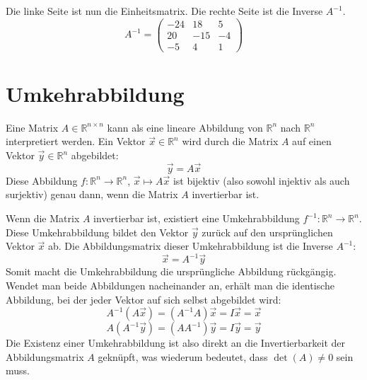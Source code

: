 Die linke Seite ist nun die Einheitsmatrix. Die rechte Seite ist die Inverse
\(A^{-1}\).
\[ A^{-1} = \begin{pmatrix}
        -24 & 18  & 5  \\
        20  & -15 & -4 \\
        -5  & 4   & 1
    \end{pmatrix} \]

\section{Umkehrabbildung}

Eine Matrix \(A \in \mathbb{R}^{n \times n}\) kann als eine lineare Abbildung
von \(\mathbb{R}^n\) nach \(\mathbb{R}^n\) interpretiert werden. Ein Vektor
\(\vec{x} \in \mathbb{R}^n\) wird durch die Matrix \(A\) auf einen Vektor
\(\vec{y} \in \mathbb{R}^n\) abgebildet:
\[ \vec{y} = A\vec{x} \]
Diese Abbildung \(f: \mathbb{R}^n \rightarrow \mathbb{R}^n\), \(\vec{x} \mapsto
A\vec{x}\) ist bijektiv (also sowohl injektiv als auch surjektiv) genau dann,
wenn die Matrix \(A\) invertierbar ist.

Wenn die Matrix \(A\) invertierbar ist, existiert eine Umkehrabbildung
\(f^{-1}: \mathbb{R}^n \rightarrow \mathbb{R}^n\). Diese Umkehrabbildung bildet
den Vektor \(\vec{y}\) zurück auf den ursprünglichen Vektor \(\vec{x}\) ab. Die
Abbildungsmatrix dieser Umkehrabbildung ist die Inverse \(A^{-1}\):
\[ \vec{x} = A^{-1}\vec{y} \]
Somit macht die Umkehrabbildung die ursprüngliche Abbildung rückgängig. Wendet
man beide Abbildungen nacheinander an, erhält man die identische Abbildung, bei
der jeder Vektor auf sich selbst abgebildet wird:
\[ A^{-1}(A\vec{x}) = (A^{-1}A)\vec{x} = I\vec{x} = \vec{x} \]
\[ A(A^{-1}\vec{y}) = (AA^{-1})\vec{y} = I\vec{y} = \vec{y} \]
Die Existenz einer Umkehrabbildung ist also direkt an die Invertierbarkeit der
Abbildungsmatrix \(A\) geknüpft, was wiederum bedeutet, dass \(\det(A) \neq 0\)
sein muss.

